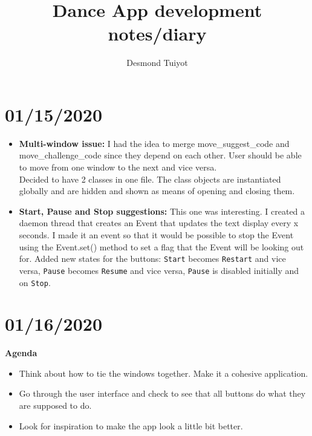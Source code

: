 \documentclass{article}
\author{Desmond Tuiyot}
\title{Dance App development notes/diary}
\begin{document}
\maketitle
\section{01/15/2020}
\begin{itemize}
	\item \textbf{Multi-window issue:} I had the idea to merge move\_suggest\_code and move\_challenge\_code since they depend on each other. User should be able to move from one window to the next and vice versa.\\
	Decided to have 2 classes in one file. The class objects are instantiated globally and are hidden and shown as means of opening and closing them.
	\item \textbf{Start, Pause and Stop suggestions: }This one was interesting. I created a daemon thread that creates an Event that updates the text display every x seconds. I made it an event so that it would be possible to stop the Event using the Event.set() method to set a flag that the Event will be looking out for. Added new states for the buttons: \texttt{Start} becomes \texttt{Restart} and vice versa, \texttt{Pause} becomes \texttt{Resume} and vice versa, \texttt{Pause} is disabled initially and on \texttt{Stop}.    
\end{itemize}

\section{01/16/2020}
\textbf{Agenda}
\begin{itemize}
	\item Think about how to tie the windows together. Make it a cohesive application.
	\item Go through the user interface and check to see that all buttons do what they are supposed to do. 
	\item Look for inspiration to make the app look a little bit better. 
\end{itemize}
\end{document}

